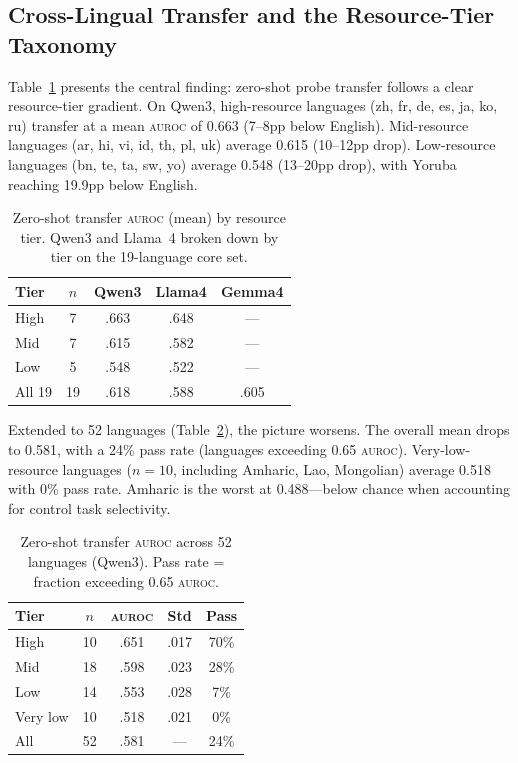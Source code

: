 \documentclass[11pt,a4paper]{article}
\newcommand{\auroc}{\textsc{auroc}}
\begin{document}
\subsection{Cross-Lingual Transfer and the Resource-Tier Taxonomy}
\label{sec:transfer}

Table~\ref{tab:transfer_tier} presents the central finding: zero-shot probe transfer follows a clear resource-tier gradient. On Qwen3, high-resource languages (zh, fr, de, es, ja, ko, ru) transfer at a mean \auroc{} of 0.663 (7--8pp below English). Mid-resource languages (ar, hi, vi, id, th, pl, uk) average 0.615 (10--12pp drop). Low-resource languages (bn, te, ta, sw, yo) average 0.548 (13--20pp drop), with Yoruba reaching 19.9pp below English.

\begin{table}[t]
\centering
\small
\begin{tabular}{@{}lcccc@{}}
\toprule
\textbf{Tier} & \textbf{$n$} & \textbf{Qwen3} & \textbf{Llama4} & \textbf{Gemma4} \\
\midrule
High & 7 & .663 & .648 & — \\
Mid & 7 & .615 & .582 & — \\
Low & 5 & .548 & .522 & — \\
\midrule
All 19 & 19 & .618 & .588 & .605 \\
\bottomrule
\end{tabular}
\caption{Zero-shot transfer \auroc{} (mean) by resource tier. Qwen3 and Llama~4 broken down by tier on the 19-language core set.}
\label{tab:transfer_tier}
\end{table}

Extended to 52 languages (Table~\ref{tab:extended}), the picture worsens. The overall mean drops to 0.581, with a 24\% pass rate (languages exceeding 0.65 \auroc{}). Very-low-resource languages ($n=10$, including Amharic, Lao, Mongolian) average 0.518 with 0\% pass rate. Amharic is the worst at 0.488---below chance when accounting for control task selectivity.

\begin{table}[t]
\centering
\small
\begin{tabular}{@{}lcccc@{}}
\toprule
\textbf{Tier} & \textbf{$n$} & \textbf{\auroc{}} & \textbf{Std} & \textbf{Pass} \\
\midrule
High & 10 & .651 & .017 & 70\% \\
Mid & 18 & .598 & .023 & 28\% \\
Low & 14 & .553 & .028 & 7\% \\
Very low & 10 & .518 & .021 & 0\% \\
\midrule
All & 52 & .581 & — & 24\% \\
\bottomrule
\end{tabular}
\caption{Zero-shot transfer \auroc{} across 52 languages (Qwen3). Pass rate = fraction exceeding 0.65 \auroc{}.}
\label{tab:extended}
\end{table}
\end{document}
